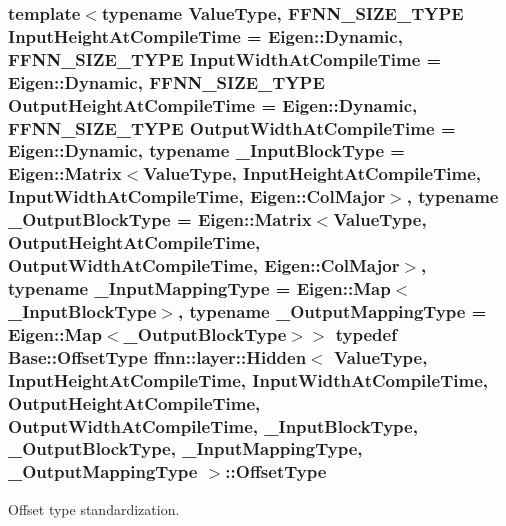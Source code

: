 \hypertarget{classffnn_1_1layer_1_1_hidden_a4a191bc002b2545231a3d80c99004693}{
\subsubsection[{Offset\-Type}]{\setlength{\rightskip}{0pt plus 5cm}template$<$typename Value\-Type, F\-F\-N\-N\-\_\-\-S\-I\-Z\-E\-\_\-\-T\-Y\-P\-E Input\-Height\-At\-Compile\-Time = Eigen\-::\-Dynamic, F\-F\-N\-N\-\_\-\-S\-I\-Z\-E\-\_\-\-T\-Y\-P\-E Input\-Width\-At\-Compile\-Time = Eigen\-::\-Dynamic, F\-F\-N\-N\-\_\-\-S\-I\-Z\-E\-\_\-\-T\-Y\-P\-E Output\-Height\-At\-Compile\-Time = Eigen\-::\-Dynamic, F\-F\-N\-N\-\_\-\-S\-I\-Z\-E\-\_\-\-T\-Y\-P\-E Output\-Width\-At\-Compile\-Time = Eigen\-::\-Dynamic, typename \-\_\-\-Input\-Block\-Type = Eigen\-::\-Matrix$<$\-Value\-Type, Input\-Height\-At\-Compile\-Time, Input\-Width\-At\-Compile\-Time, Eigen\-::\-Col\-Major$>$, typename \-\_\-\-Output\-Block\-Type = Eigen\-::\-Matrix$<$\-Value\-Type, Output\-Height\-At\-Compile\-Time, Output\-Width\-At\-Compile\-Time, Eigen\-::\-Col\-Major$>$, typename \-\_\-\-Input\-Mapping\-Type = Eigen\-::\-Map$<$\-\_\-\-Input\-Block\-Type$>$, typename \-\_\-\-Output\-Mapping\-Type = Eigen\-::\-Map$<$\-\_\-\-Output\-Block\-Type$>$$>$ typedef {\bf Base\-::\-Offset\-Type} {\bf ffnn\-::layer\-::\-Hidden}$<$ Value\-Type, Input\-Height\-At\-Compile\-Time, Input\-Width\-At\-Compile\-Time, Output\-Height\-At\-Compile\-Time, Output\-Width\-At\-Compile\-Time, \-\_\-\-Input\-Block\-Type, \-\_\-\-Output\-Block\-Type, \-\_\-\-Input\-Mapping\-Type, \-\_\-\-Output\-Mapping\-Type $>$\-::{\bf Offset\-Type}}}\label{classffnn_1_1layer_1_1_hidden_a4a191bc002b2545231a3d80c99004693}


Offset type standardization. 


